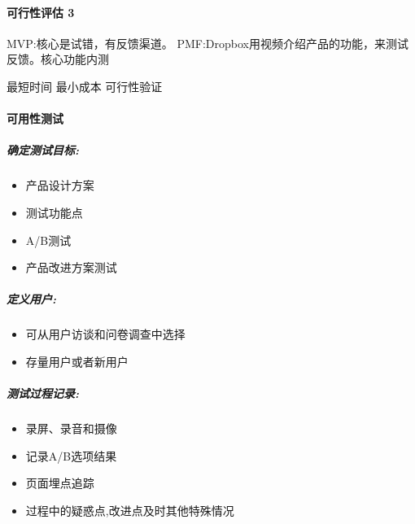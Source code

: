 \documentclass[letterpaper,10pt,english]{sphinxmanual}
\begin{document}
\paragraph{可行性评估 3\sphinxfootnotemark[488]}
\label{\detokenize{chapter_knowledge/BRD:id10}}%
\begin{footnotetext}[488]\sphinxAtStartFootnote
{}
%
\end{footnotetext}\ignorespaces 
MVP:核心是试错，有反馈渠道。
PMF:Dropbox用视频介绍产品的功能，来测试反馈。核心功能内测

最短时间 最小成本 可行性验证


\paragraph{可用性测试}
\label{\detokenize{chapter_knowledge/BRD:id11}}

\subparagraph{确定测试目标:}
\label{\detokenize{chapter_knowledge/BRD:id12}}\begin{itemize}
\item {} 
产品设计方案

\item {} 
测试功能点

\item {} 
A/B测试

\item {} 
产品改进方案测试

\end{itemize}


\subparagraph{定义用户:}
\label{\detokenize{chapter_knowledge/BRD:id13}}\begin{itemize}
\item {} 
可从用户访谈和问卷调查中选择

\item {} 
存量用户或者新用户

\end{itemize}


\subparagraph{测试过程记录:}
\label{\detokenize{chapter_knowledge/BRD:id14}}\begin{itemize}
\item {} 
录屏、录音和摄像

\item {} 
记录A/B选项结果

\item {} 
页面埋点追踪

\item {} 
过程中的疑惑点,改进点及时其他特殊情况

\end{itemize}
\end{document}
